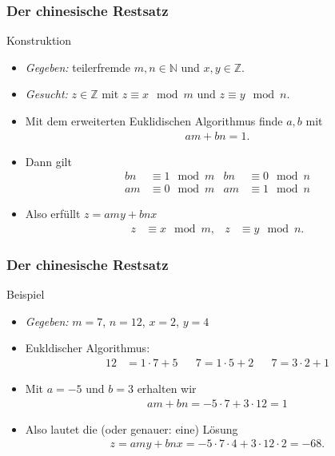 \documentclass{beamer}
\renewcommand{\emph}[1]{{\textcolor{solarizedRed}{\itshape #1}}}
\newcommand\NN{\mathbb N}
\newcommand\ZZ{\mathbb Z}
\renewcommand{\oe}{\"o}
\newcommand{\ue}{\"u}
\begin{document}
\begin{frame}\frametitle{Der chinesische Restsatz}
	\begin{block}{Konstruktion}
		\begin{itemize}
			\item \emph{Gegeben:} teilerfremde $m,n\in\NN$ und $x,y\in\ZZ$.
			\item \emph{Gesucht:} $z\in\ZZ$ mit $z\equiv x\mod m$ und $z\equiv y\mod n$.
			\item Mit dem erweiterten Euklidischen Algorithmus finde $a,b$ mit
				\begin{align*}
					am+bn=1.
				\end{align*}
			\item Dann gilt
				\begin{align*}
					bn&\equiv 1\mod m&bn&\equiv0\mod n\\
					am&\equiv 0\mod m&am&\equiv1\mod n
				\end{align*}
			\item Also erf\ue llt $z=amy+bnx$
				\begin{align*}
					z&\equiv x\mod m,&z&\equiv y\mod n.
				\end{align*}
		\end{itemize}
	\end{block}
\end{frame}

\begin{frame}\frametitle{Der chinesische Restsatz}
	\begin{block}{Beispiel}
		\begin{itemize}
			\item \emph{Gegeben:} $m=7$, $n=12$, $x=2$, $y=4$
			\item Eukldischer Algorithmus:
				\begin{align*}
					12&=1\cdot 7+5&&7=1\cdot 5+2&&7=3\cdot 2+1
				\end{align*}
			\item Mit $a=-5$ und $b=3$ erhalten wir
				\begin{align*}
				am+bn=-5\cdot 7+3\cdot 12=1
				\end{align*}
			\item Also lautet die (oder genauer: eine) L\oe sung
				\begin{align*}
				z=amy+bnx=-5\cdot 7\cdot 4+3\cdot 12\cdot 2=-68.
				\end{align*}
		\end{itemize}
	\end{block}
\end{frame}
\end{document}
